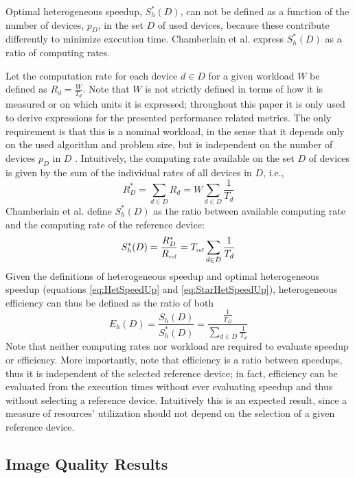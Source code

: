Optimal heterogeneous speedup, $S_h^*(D)$, can not be defined as a function of the number of devices, $p_D$, in the set $D$ of used devices, because these contribute differently to minimize execution time. Chamberlain et al. \cite{Chamberlain98} express $S_h^*(D)$ as a ratio of computing rates. 

Let the computation rate for each device $d \in D$ for a given workload $W$ be defined as $R_d = \frac{W}{T_d}$. Note that $W$ is not strictly defined in terms of how it is measured or on which units it is expressed; throughout this paper it is only used to derive expressions for the presented performance related metrics. The only requirement is that this is a nominal workload, in the sense that it depends only on the used algorithm and problem size, but is independent on the number of devices $p_D$ in $D$ \cite[p.~23]{Hockney96}. Intuitively, the computing rate available on the set $D$ of devices is given by the sum of the individual rates of all devices in $D$, i.e.,
\begin{equation}
R^*_D = \sum_{d \in D} R_d = W \sum_{d \in D} \frac{1}{T_d}
\label{eq:StarCapacity}
\end{equation}
Chamberlain et al. \cite{Chamberlain98} define $S_h^*(D)$ as the ratio between available computing rate and the computing rate of the reference device:
\begin{equation}
S^*_h(D) = \frac{R^*_D}{R_{\mbox{\tiny ref}}} = T_{\mbox{\tiny ref}} \sum_{d \in D} \frac{1}{T_d}
\label{eq:StarHetSpeedUp}
\end{equation}
Given the definitions of heterogeneous speedup and optimal heterogeneous speedup (equations \ref{eq:HetSpeedUp} and \ref{eq:StarHetSpeedUp}), heterogeneous efficiency can thus be defined as the ratio of both
\begin{equation}
E_h(D) = \frac{S_h(D)}{S_h^*(D)} = \frac{\frac{1}{T_D}}{\sum_{d \in D} \frac{1}{T_d}}
\label{eq:HetEff}
\end{equation}
Note that neither computing rates nor workload are required to evaluate speedup or efficiency. More importantly, note that efficiency is a ratio between speedups, thus it is independent of the selected reference device; in fact, efficiency can be evaluated from the execution times without ever evaluating speedup and thus without selecting a reference device. Intuitively this is an expected result, since a measure of resources' utilization should not depend on the selection of a given reference device.

\subsection{Image Quality Results}

